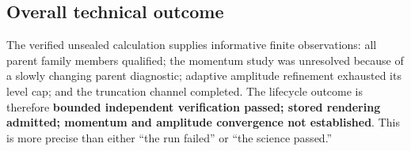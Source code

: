 \subsection{Overall technical outcome}

The verified unsealed calculation supplies informative finite observations: all parent
family members qualified; the momentum study was unresolved because of a slowly changing
parent diagnostic; adaptive amplitude refinement exhausted its level cap; and the
truncation channel completed.  The lifecycle outcome is therefore
\textbf{bounded independent verification passed; stored rendering admitted; momentum
and amplitude convergence not established}.  This is more precise than either ``the run
failed'' or ``the science passed.''
